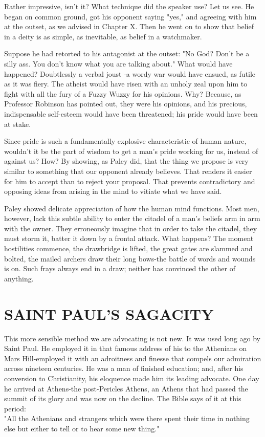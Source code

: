 \documentclass[10pt]{article}
\begin{document}
Rather impressive, isn't it? What technique did the speaker use? Let us see. He began on common ground, got his opponent saying "yes," and agreeing with him at the outset, as we advised in Chapter X. Then he went on to show that belief in a deity is as simple, as inevitable, as belief in a watchmaker.

Suppose he had retorted to his antagonist at the outset: "No God? Don't be a silly ass. You don't know what you are talking about." What would have happened? Doubtlessly a verbal joust -a wordy war would have ensued, as futile as it was fiery. The atheist would have risen with an unholy zeal upon him to fight with all the fury of a Fuzzy Wuzzy for his opinions. Why? Because, as Professor Robinson has pointed out, they were his opinions, and his precious, indispensable self-esteem would have been threatened; his pride would have been at stake.

Since pride is such a fundamentally explosive characteristic of human nature, wouldn't it be the part of wisdom to get a man's pride working for us, instead of against us? How? By showing, as Paley did, that the thing we propose is very similar to something that our opponent already believes. That renders it easier for him to accept than to reject your proposal. That prevents contradictory and opposing ideas from arising in the mind to vitiate what we have said.

Paley showed delicate appreciation of how the human mind functions. Most men, however, lack this subtle ability to enter the citadel of a man's beliefs arm in arm with the owner. They erroneously imagine that in order to take the citadel, they must storm it, batter it down by a frontal attack. What happens? The moment hostilities commence, the drawbridge is lifted, the great gates are slammed and bolted, the mailed archers draw their long bows-the battle of words and wounds is on. Such frays always end in a draw; neither has convinced the other of anything.

\section*{SAINT PAUL'S SAGACITY}
This more sensible method we are advocating is not new. It was used long ago by Saint Paul. He employed it in that famous address of his to the Athenians on Mars Hill-employed it with an adroitness and finesse that compels our admiration across nineteen centuries. He was a man of finished education; and, after his conversion to Christianity, his eloquence made him its leading advocate. One day he arrived at Athens-the post-Pericles Athens, an Athens that had passed the summit of its glory and was now on the decline. The Bible says of it at this period:\\
"All the Athenians and strangers which were there spent their time in nothing else but either to tell or to hear some new thing."
\end{document}
